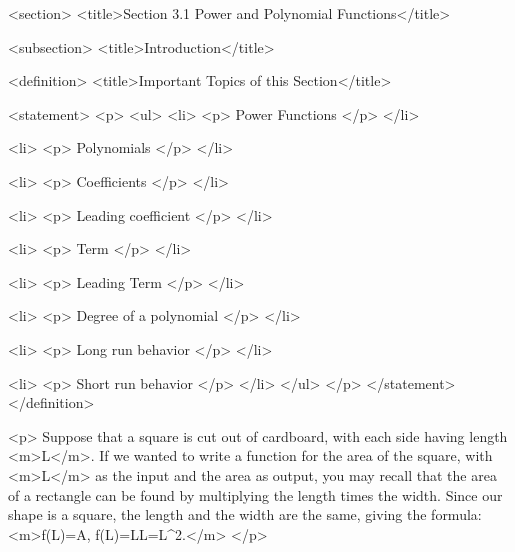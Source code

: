 <section>
    <title>Section 3.1 Power and Polynomial Functions</title>

    <subsection>
        <title>Introduction</title>

        <definition>
            <title>Important Topics of this Section</title>

            <statement>
                <p>
                    <ul>
                        <li>
                            <p>
                                Power Functions
                            </p>
                        </li>

                        <li>
                            <p>
                                Polynomials
                            </p>
                        </li>

                        <li>
                            <p>
                                Coefficients
                            </p>
                        </li>

                        <li>
                            <p>
                                Leading coefficient
                            </p>
                        </li>

                        <li>
                            <p>
                                Term
                            </p>
                        </li>

                        <li>
                            <p>
                                Leading Term
                            </p>
                        </li>

                        <li>
                            <p>
                                Degree of a polynomial
                            </p>
                        </li>

                        <li>
                            <p>
                                Long run behavior
                            </p>
                        </li>

                        <li>
                            <p>
                                Short run behavior
                            </p>
                        </li>
                    </ul>
                </p>
            </statement>
        </definition>

        <p>
            Suppose that a square is cut out of cardboard, with each side having length <m>L</m>.
            If we wanted to write a function for the area of the square, with <m>L</m> as the input and the area as output, you may recall that the area of a rectangle can be found by multiplying the length times the width.
            Since our shape is a square, the length and the width are the same, giving the formula: <m>f(L)=A, f(L)=L\times L=L^{2}.</m>
        </p>

